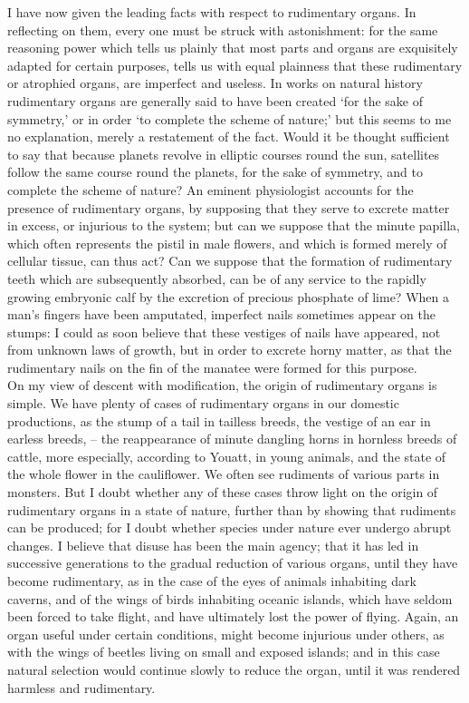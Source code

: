 \indent I have now given the leading facts with respect to rudimentary organs. In reflecting on them, every one must be struck with astonishment: for the same reasoning power which tells us plainly that most parts and organs are exquisitely adapted for certain purposes, tells us with equal plainness that these rudimentary or atrophied organs, are imperfect and useless. In works on natural history rudimentary organs are generally said to have been created `for the sake of symmetry,' or in order `to complete the scheme of nature;' but this seems to me no explanation, merely a restatement of the fact. Would it be thought sufficient to say that because planets revolve in elliptic courses round the sun, satellites follow the same course round the planets, for the sake of symmetry, and to complete the scheme of nature? An eminent physiologist accounts for the presence of rudimentary organs, by supposing that they serve to excrete matter in excess, or injurious to the system; but can we suppose that the minute papilla, which often represents the pistil in male flowers, and which is formed merely of cellular tissue, can thus act? Can we suppose that the formation of rudimentary teeth which are subsequently absorbed, can be of any service to the rapidly growing embryonic calf by the excretion of precious phosphate of lime? When a man's fingers have been amputated, imperfect nails sometimes appear on the stumps: I could as soon believe that these vestiges of nails have appeared, not from unknown laws of growth, but in order to excrete horny matter, as that the rudimentary nails on the fin of the manatee were formed for this purpose.~\\
\indent On my view of descent with modification, the origin of rudimentary organs is simple. We have plenty of cases of rudimentary organs in our domestic productions, as the stump of a tail in tailless breeds, the vestige of an ear in earless breeds, -- the reappearance of minute dangling horns in hornless breeds of cattle, more especially, according to Youatt, in young animals, and the state of the whole flower in the cauliflower. We often see rudiments of various parts in monsters. But I doubt whether any of these cases throw light on the origin of rudimentary organs in a state of nature, further than by showing that rudiments can be produced; for I doubt whether species under nature ever undergo abrupt changes. I believe that disuse has been the main agency; that it has led in successive generations to the gradual reduction of various organs, until they have become rudimentary, as in the case of the eyes of animals inhabiting dark caverns, and of the wings of birds inhabiting oceanic islands, which have seldom been forced to take flight, and have ultimately lost the power of flying. Again, an organ useful under certain conditions, might become injurious under others, as with the wings of beetles living on small and exposed islands; and in this case natural selection would continue slowly to reduce the organ, until it was rendered harmless and rudimentary.~\\
